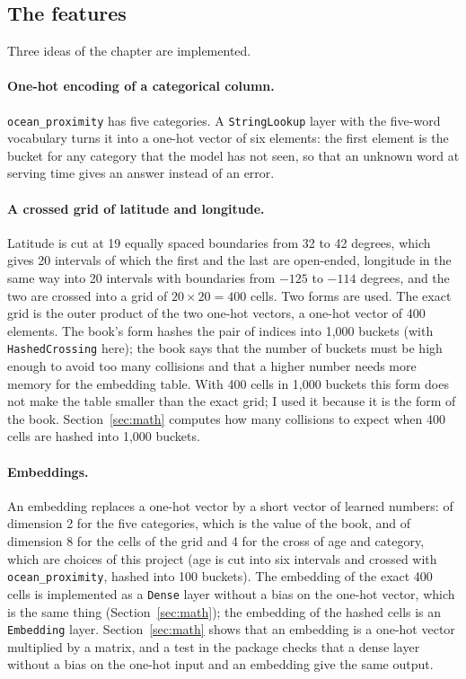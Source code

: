 \subsection{The features}

Three ideas of the chapter are implemented.

\paragraph{One-hot encoding of a categorical column.} \texttt{ocean\_proximity} has five categories. A \texttt{StringLookup} layer with the five-word vocabulary turns it into a one-hot vector of six elements: the first element is the bucket for any category that the model has not seen, so that an unknown word at serving time gives an answer instead of an error.

\paragraph{A crossed grid of latitude and longitude.} Latitude is cut at 19 equally spaced boundaries from 32 to 42 degrees, which gives 20 intervals of which the first and the last are open-ended, longitude in the same way into 20 intervals with boundaries from $-125$ to $-114$ degrees, and the two are crossed into a grid of $20 \times 20 = 400$ cells. Two forms are used. The exact grid is the outer product of the two one-hot vectors, a one-hot vector of 400 elements. The book's form hashes the pair of indices into 1,000 buckets (with \texttt{HashedCrossing} here); the book says that the number of buckets must be high enough to avoid too many collisions and that a higher number needs more memory for the embedding table. With 400 cells in 1,000 buckets this form does not make the table smaller than the exact grid; I used it because it is the form of the book. Section~\ref{sec:math} computes how many collisions to expect when 400 cells are hashed into 1,000 buckets.

\paragraph{Embeddings.} An embedding replaces a one-hot vector by a short vector of learned numbers: of dimension 2 for the five categories, which is the value of the book, and of dimension 8 for the cells of the grid and 4 for the cross of age and category, which are choices of this project (age is cut into six intervals and crossed with \texttt{ocean\_proximity}, hashed into 100 buckets). The embedding of the exact 400 cells is implemented as a \texttt{Dense} layer without a bias on the one-hot vector, which is the same thing (Section~\ref{sec:math}); the embedding of the hashed cells is an \texttt{Embedding} layer. Section~\ref{sec:math} shows that an embedding is a one-hot vector multiplied by a matrix, and a test in the package checks that a dense layer without a bias on the one-hot input and an embedding give the same output.

